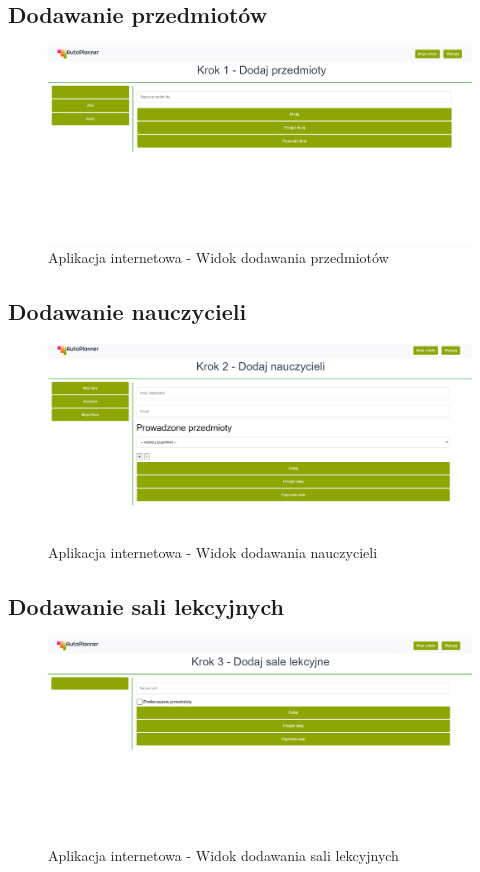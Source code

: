 \subsection{Dodawanie przedmiotów}
\begin{figure}[t]
\centering\includegraphics[width=\textwidth]{figures/subject}
\caption{Aplikacja internetowa - Widok dodawania przedmiotów}\label{rys:subject}
\end{figure}
\subsection{Dodawanie nauczycieli}
\begin{figure}[t]
\centering\includegraphics[width=\textwidth]{figures/teacher}
\caption{Aplikacja internetowa - Widok dodawania nauczycieli}\label{rys:teacher}
\end{figure}
\subsection{Dodawanie sali lekcyjnych}
\begin{figure}[t]
\centering\includegraphics[width=\textwidth]{figures/classroom}
\caption{Aplikacja internetowa - Widok dodawania sali lekcyjnych}\label{rys:classroom}
\end{figure}
